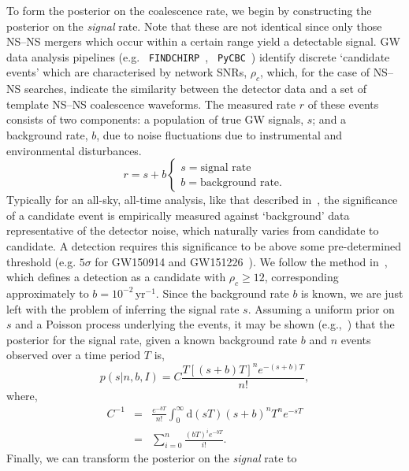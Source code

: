 \documentclass[twocolumn,nofootinbib]{revtex4-1}
\newcommand{\diff}{{\mathrm d}}
\newcommand{\BNS}{\ac{NS}--\ac{NS}\xspace}
\begin{document}
To form the posterior on the coalescence rate, we begin by constructing the
posterior on the \emph{signal} rate.  Note that these are not identical since
only those \BNS mergers which occur within a certain range yield a detectable
signal.  \ac{GW} data analysis pipelines (e.g. {\tt
FINDCHIRP}~\cite{2012PhRvD..85l2006A}, {\tt
PyCBC}~\cite{Canton:2014ena,Usman:2015kfa,alex_nitz_2017_844934}) identify
discrete `candidate events' which are characterised by network \acp{SNR},
$\rho_c$, which, for the case of \BNS searches, indicate the similarity between
the detector data and a set of template \BNS coalescence waveforms.  The
measured rate $r$ of these events consists of two components: a population of
true \ac{GW} signals, $s$; and a background rate, $b$, due to noise fluctuations
due to instrumental and environmental disturbances.
%
\begin{equation}
r = s + b
\begin{cases}
s = \text{signal rate} \\
b = \text{background rate}.
\end{cases}
\end{equation}
%
Typically for an all-sky, all-time analysis, like that described
in~\cite{Usman:2015kfa}, the significance of a candidate event is
empirically measured against `background' data representative of the
detector noise, which naturally varies from candidate to candidate.  A
detection requires this significance to be above some pre-determined
threshold (e.g. $5\sigma$ for GW150914 and
GW151226~\cite{Abbott:2016blz,Abbott:2016nmj}).  We follow the method
in~\cite{Aasi:2013wya}, which defines a detection as a candidate with
$\rho_c \geq 12$, corresponding approximately to
$b=10^{-2}$\,yr$^{-1}$.  Since the background rate $b$ is known, we
are just left with the problem of inferring the signal rate $s$.
Assuming a uniform prior on $s$ and a Poisson process underlying the
events, it may be shown (e.g.,~\cite{2010blda.book.....G}) that the
posterior for the signal rate, given a known background rate $b$ and
$n$ events observed over a time period $T$ is,
%
\begin{equation}
p(s|n,b,I) = C \frac{ T\left[(s+b)T\right]^n e^{-(s+b)T}}{n!},
\end{equation}
%
where,
\begin{eqnarray}
C^{-1} & = &\frac{e^{-bT}}{n!} \int_0^{\infty}\diff(sT)(s+b)^n T^n e^{-sT}\\
& = & \sum_{i=0}^n \frac{ (bT)^i e^{-bT}}{i!}.
\end{eqnarray}
%
Finally, we can transform the posterior on the \emph{signal} rate to
\end{document}
